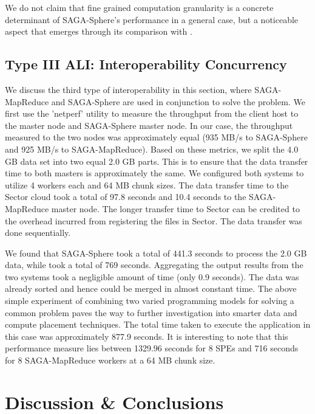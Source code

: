 \documentclass[3p,twocolumn]{elsarticle}
\begin{document}
We do not claim that fine grained computation granularity is a concrete
determinant of SAGA-Sphere's performance in a general case, but a
noticeable aspect that emerges through its comparison with
\sagamapreduce.


\subsection{Type III ALI: Interoperability Concurrency}

We discuss the third type of interoperability in this section,
where SAGA-MapReduce and SAGA-Sphere are used in conjunction
to solve the \wc problem. We first use the 'netperf'
utility to measure the throughput from the client host to
the \sagamapreduce master node and SAGA-Sphere master node.
In our case, the throughput measured to the two nodes was
approximately equal (935 MB/s to SAGA-Sphere and 925 MB/s to SAGA-MapReduce).
Based on these metrics, we split the 4.0 GB data set
into two equal 2.0 GB parts. This is to ensure that the data
transfer time to both masters is approximately the same. We
configured both systems to utilize 4 workers each
and 64 MB chunk sizes. The data transfer time to the Sector
cloud took a total of 97.8 seconds and 10.4 seconds to the
SAGA-MapReduce master node. The longer transfer time to Sector
can be credited to the overhead incurred from registering
the files in Sector. The data transfer was done sequentially.

We found that SAGA-Sphere took a total of 441.3 seconds to process the
2.0 GB data, while \sagamapreduce took a total of 769
seconds. Aggregating the output results from the two systems took a
negligible amount of time (only 0.9 seconds). The data was already
sorted and hence could be merged in almost constant
time. %
The above simple experiment of combining two varied programming models
for solving a common problem paves the way to further investigation
into smarter data and compute placement techniques.  The total time
taken to execute the \wc application in this case was approximately
877.9 seconds. It is interesting to note that this performance measure
lies between 1329.96 seconds for 8 SPEs and 716 seconds for 8
SAGA-MapReduce workers at a 64 MB chunk size.

\section{Discussion \& Conclusions}
\label{sec:discuss}
\end{document}
